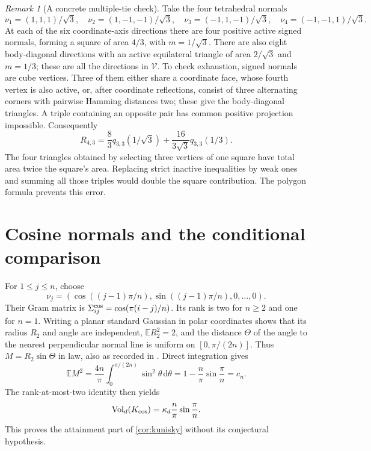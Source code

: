 \documentclass[10pt,reqno]{amsart}
\theoremstyle{definition}
\theoremstyle{remark}
\newtheorem{remark}[theorem]{Remark}
\newcommand{\E}{\mathbb E}
\newcommand{\Vol}{\operatorname{Vol}}
\newcommand{\dd}{\,\mathrm d}
\begin{document}
\begin{remark}[A concrete multiple-tie check]\label{rem:tetrahedron}
Take the four tetrahedral normals
\[
\nu_1=(1,1,1)/\sqrt3,\quad\nu_2=(1,-1,-1)/\sqrt3,\quad
\nu_3=(-1,1,-1)/\sqrt3,\quad\nu_4=(-1,-1,1)/\sqrt3.
\]
At each of the six coordinate-axis directions there are four positive active signed normals, forming a square of area $4/3$, with $m=1/\sqrt3$. There are also eight body-diagonal directions with an active equilateral triangle of area $2/\sqrt3$ and $m=1/3$; these are all the directions in $\mathcal V$. To check exhaustion, signed normals are cube vertices. Three of them either share a coordinate face, whose fourth vertex is also active, or, after coordinate reflections, consist of three alternating corners with pairwise Hamming distances two; these give the body-diagonal triangles. A triple containing an opposite pair has common positive projection impossible. Consequently
\begin{equation}\label{eq:tetra-R}
R_{4,3}=\frac83q_{3,3}(1/\sqrt3)+\frac{16}{3\sqrt3}q_{3,3}(1/3).
\end{equation}
The four triangles obtained by selecting three vertices of one square have total area twice the square's area. Replacing strict inactive inequalities by weak ones and summing all those triples would double the square contribution. The polygon formula prevents this error.
\end{remark}

\section{Cosine normals and the conditional comparison}\label{sec:cosine}
For $1\le j\le n$, choose
\[
\nu_j=(\cos((j-1)\pi/n),\sin((j-1)\pi/n),0,\ldots,0).
\]
Their Gram matrix is $\Sigma^{\rm cos}_{ij}=\cos(\pi(i-j)/n)$. Its rank is two for $n\ge2$ and one for $n=1$.
Writing a planar standard Gaussian in polar coordinates shows that its radius $R_2$ and angle are independent, $\E R_2^2=2$, and the distance $\Theta$ of the angle to the nearest perpendicular normal line is uniform on $[0,\pi/(2n)]$. Thus $M=R_2\sin\Theta$ in law, also as recorded in \cite[Proposition 2.1]{Kunisky}. Direct integration gives
\begin{equation}\label{eq:cosine-moment}
\E M^2=\frac{4n}{\pi}\int_0^{\pi/(2n)}\sin^2\theta\dd\theta
=1-\frac n\pi\sin\frac\pi n=c_n.
\end{equation}
The rank-at-most-two identity then yields
\begin{equation}\label{eq:cosine-volume}
\Vol_d(K_{\rm cos})=\kappa_d\frac n\pi\sin\frac\pi n.
\end{equation}
This proves the attainment part of \cref{cor:kunisky} without its conjectural hypothesis.
\end{document}
